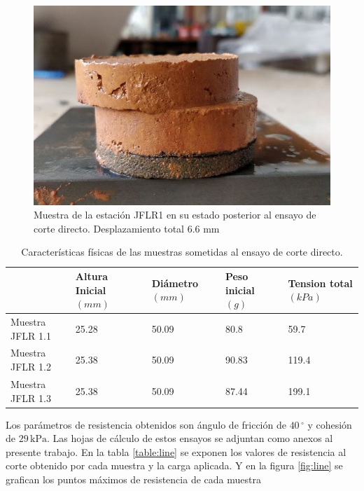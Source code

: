 \begin{figure}[H]
\centering
\includegraphics[scale=0.8]{img/fallada.jpg}
\caption{Muestra de la estaci\'on JFLR1 en su estado posterior al ensayo de corte directo.  Desplazamiento total 6.6 mm}
\label{fig:toma-bloque}
\end{figure}


\begin{table}[H]
\centering
\caption{Caracter\'isticas f\'isicas de las muestras sometidas al ensayo de corte directo. }
\begin{tabular}{l|l|l|l|l|}
\cline{2-5}
                                & Altura Inicial $\left( mm \right) $ &  Di\'ametro $\left( mm \right) $ & Peso inicial $\left( g \right) $ & Tension total$\left( kPa \right) $ \\ \hline
\multicolumn{1}{|l|}{Muestra JFLR 1.1} & 25.28          & 50.09    & 80.8             & 59.7               \\ \hline
\multicolumn{1}{|l|}{Muestra JFLR 1.2} & 25.38          & 50.09    & 90.83            & 119.4              \\ \hline
\multicolumn{1}{|l|}{Muestra JFLR 1.3} & 25.38          & 50.09    & 87.44            & 199.1              \\ \hline
\end{tabular}
\end{table}



Los par\'ametros de resistencia obtenidos son \'angulo de fricci\'on de \(40\,^\circ\) y cohesi\'on de \(29\,\text{kPa}\). Las hojas de c\'alculo de estos ensayos se adjuntan como anexos al presente trabajo.
En la tabla \ref{table:line}  se exponen los valores de resistencia al corte obtenido por cada muestra  y la carga aplicada. Y en la figura \ref{fig:line} se grafican los puntos m\'aximos de resistencia de cada muestra




